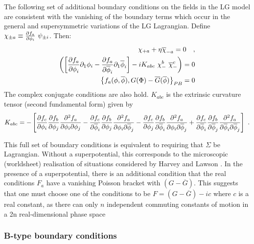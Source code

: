 \documentclass[a4paper,12pt]{article}
\begin{document}
The following set of additional
boundary conditions on the fields in the LG model
are consistent with the vanishing of the 
boundary terms which occur in the
general and supersymmetric variations of the LG Lagrangian.
Define
$\chi_{\pm a}\equiv {{\partial f_a}\over{\partial\phi_i}}\ \psi_{\pm i}$.
Then: 
\begin{eqnarray}
\chi_{+a} + \eta \overline{\chi}_{-a} =0\quad, \\
\left(
\left[{{\partial f_a}\over{\partial\phi}_i}
\partial_1\phi_i
- {{\partial f_a}\over{\partial\overline{\phi}_i}}
\partial_1\overline{\phi}_i\right]
-i K_{abc}\ \chi_{-}^b\ \overline{\chi}_{-}^c \right) =0\\
\left\{f_a(\phi,\overline{\phi}),G(\Phi)-\overline{G}(\overline{\phi})
\right\}_{PB}=0
\end{eqnarray}
The complex conjugate conditions are also hold.
$K_{abc}$ is the extrinsic curvature tensor (second fundamental form)
given by
\begin{equation}
K_{abc} =-\left [
{{\partial f_c}\over{\partial\phi_i}}
{{\partial f_b}\over{\partial\phi_j}}
{{\partial^2f_a}\over {\partial\phi_i\partial\phi_j}}
- {{\partial f_c}\over{\partial\overline{\phi}_i}}
 {{\partial f_b}\over{\partial\phi_j}}
{{\partial^2f_a}\over {\partial\phi_i\partial\overline{\phi}_j}}
- {{\partial f_c}\over{\partial\phi_j}}
 {{\partial f_b}\over{\partial\overline{\phi}_i}}
{{\partial^2f_a}\over {\partial\phi_i\partial\overline{\phi}_j}}
+{{\partial f_c}\over{\partial\overline{\phi}_i}}
{{\partial f_b}\over{\partial\overline{\phi}_j}}
{{\partial^2f_a}\over{\partial\overline{\phi}_i\partial\overline{\phi}_j}}
\right]\ .
\end{equation}

This full set of boundary conditions
is equivalent to requiring that $\Sigma$
be Lagrangian.  Without a superpotential, this
corresponds to the microscopic (worldsheet)
realisation of situations considered by
Harvey and Lawson \cite{harveylawson}.
In the presence of a superpotential, there 
is an additional condition that the real
conditions $F_a$ have a vanishing Poisson bracket with $(G-\overline{G})$. 
This suggests that one must choose one of the conditions
to be $F=(G-\overline{G})-i c$ where $c$ is a real constant,
as there can only $n$ independent commuting constants of motion
in a 2n real-dimensional phase space


\subsubsection{B-type boundary conditions}
\end{document}
